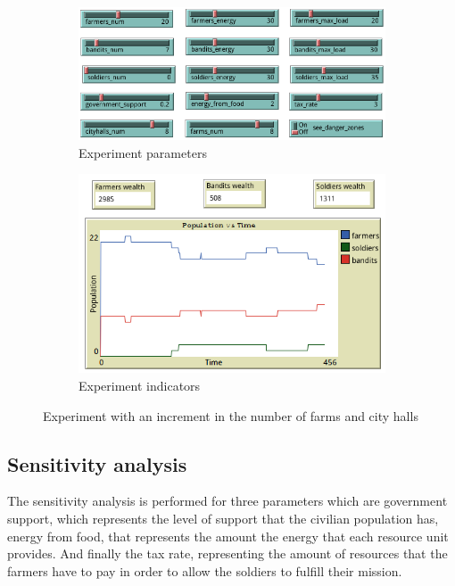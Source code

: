 \documentclass{wscpaperproc}
\begin{document}
\begin{figure}[h!]
    \begin{subfigure}{0.45\textwidth}
    \includegraphics[width=\textwidth]{Images/Exp5_sliders.png}
    \caption{Experiment parameters}
    \end{subfigure}
    \hfill
    \begin{subfigure}{0.45\textwidth}
    \includegraphics[width=\textwidth]{Images/Exp5_indicators.png}
    \caption{Experiment indicators}
    \end{subfigure}%
    \caption{Experiment with an increment in the number of farms and city halls}
    \label{more_buildings}
\end{figure}

\subsection{Sensitivity analysis}

The sensitivity analysis is performed for three parameters which are government
support, which represents the level of support that the civilian population has,
energy from food, that represents the amount the energy that each resource unit
provides. And finally the tax rate, representing the amount of resources that
the farmers have to pay in order to allow the soldiers to fulfill their mission.
\end{document}

